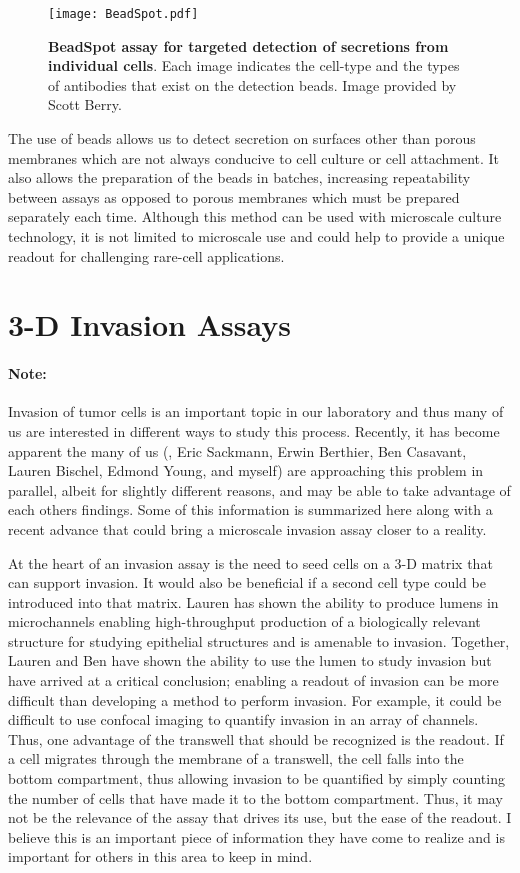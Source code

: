 \begin{figure}[!ht]
\centering
\texttt{[image: BeadSpot.pdf]}
\caption{\textbf{BeadSpot assay for targeted detection of secretions from individual cells}. Each image indicates the cell-type and the types of antibodies that exist on the detection beads. Image provided by Scott Berry.}
\label{Chap:FutureDirections:fig:beadSpot}
\end{figure}

The use of beads allows us to detect secretion on surfaces other than porous membranes which are not always conducive to cell culture or cell attachment. It also allows the preparation of the beads in batches, increasing repeatability between assays as opposed to porous membranes which must be prepared separately each time. Although this method can be used with microscale culture technology, it is not limited to microscale use and could help to provide a unique readout for challenging rare-cell applications.

\section{3-D Invasion Assays}
\paragraph{Note:} Invasion of tumor cells is an important topic in our laboratory and thus many of us are interested in different ways to study this process. Recently, it has become apparent the many of us (\eg, Eric Sackmann, Erwin Berthier, Ben Casavant, Lauren Bischel, Edmond Young, and myself) are approaching this problem in parallel, albeit for slightly different reasons, and may be able to take advantage of each others findings. Some of this information is summarized here along with a recent advance that could bring a microscale invasion assay closer to a reality.

At the heart of an invasion assay is the need to seed cells on a 3-D matrix that can support invasion. It would also be beneficial if a second cell type could be introduced into that matrix. Lauren has shown the ability to produce lumens in microchannels enabling high-throughput production of a biologically relevant structure for studying epithelial structures and is amenable to invasion. Together, Lauren and Ben have shown the ability to use the lumen to study invasion but have arrived at a critical conclusion; enabling a readout of invasion can be more difficult than developing a method to perform invasion. For example, it could be difficult to use confocal imaging to quantify invasion in an array of channels. Thus, one advantage of the transwell that should be recognized is the readout. If a cell migrates through the membrane of a transwell, the cell falls into the bottom compartment, thus allowing invasion to be quantified by simply counting the number of cells that have made it to the bottom compartment. Thus, it may not be the relevance of the assay that drives its use, but the ease of the readout. I believe this is an important piece of information they have come to realize and is important for others in this area to keep in mind. 

